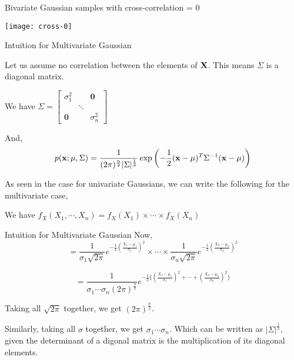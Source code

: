\documentclass{beamer}
\begin{document}
\begin{frame}{Bivariate Gaussian samples with cross-correlation  = 0}
	\begin{center}
		\texttt{[image: cross-0]}
	\end{center}
\end{frame}

\begin{frame}{Intuition for Multivariate Gaussian}
	
	Let us assume no correlation between the elements of $\bf{X}$. This means $\Sigma$ is a diagonal matrix.
	
	We have $\Sigma = \begin{bmatrix} 
	\sigma_{1}^2 & & \textbf{0}\\
	 & \ddots &\\
	\textbf{0} &  & \sigma_n^2 
	\end{bmatrix}
	$ 
	
	And,
	\begin{gather}
		p(\mathbf{x} ; \mu, \Sigma)=\frac{1}{(2 \pi)^{\frac{n}{2}}|\Sigma|^{\frac{1}{2}}} \exp \left(-\frac{1}{2}(\mathbf{x}-\mu)^{T} \Sigma^{-1}(\mathbf{x}-\mu)\right)
	\end{gather}
	
	As seen in the case for univariate Gaussians, we can write the following for the multivariate case,
	
	We have $f_X(X_1, \cdots, X_n) = f_X(X_1)\times \cdots \times f_X(X_n)$
\end{frame}

\begin{frame}{Intuition for Multivariate Gaussian}
	Now,
	$$=\frac{1}{\sigma_1 \sqrt{2\pi} } e^{-\frac{1}{2}\left(\frac{X_1-\mu_1}{\sigma_1}\right)^2} \times \cdots \times \frac{1}{\sigma_n \sqrt{2\pi} } e^{-\frac{1}{2}\left(\frac{X_n-\mu_n}{\sigma_n}\right)^2}$$
	
	$$= \frac{1}{\sigma_1 \cdots \sigma_n (2\pi)^{\frac{n}{2}} } e^{-\frac{1}{2}\{\left(\frac{X_1-\mu_1}{\sigma_1}\right)^2 + \cdots + \left(\frac{X_n-\mu_n}{\sigma_n}\right)^2 \}}  $$
	
	Taking all $\sqrt{2\pi}$ together, we get $(2\pi)^{\frac{n}{2}}$.
	
	Similarly, taking all $\sigma$ together, we get $\sigma_1 \cdots \sigma_n$. Which can be written as $\vert\Sigma\vert^{\frac{1}{2}}$, given the determinant of a digonal matrix is the multiplication of its diagonal elements.
\end{frame}
\end{document}
